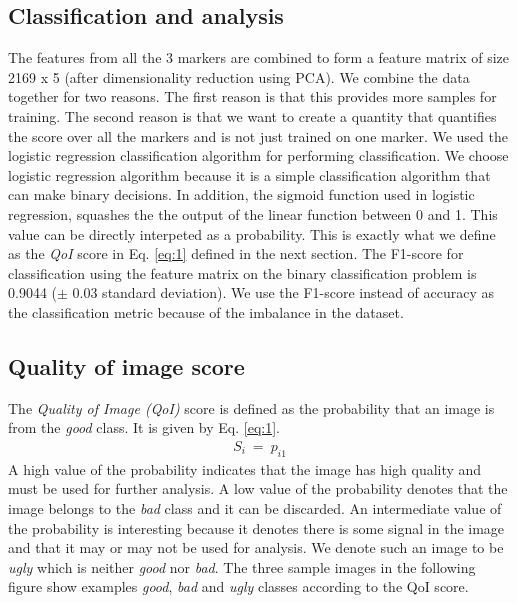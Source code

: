 \subsection{Classification and analysis}
The features from all the 3 markers are combined to form a feature matrix of size 2169 x 5 (after dimensionality reduction using PCA). We combine the data together for two reasons. The first reason is that this provides more samples for training. The second reason is that we want to create a quantity that quantifies the score over all the markers and is not just trained on one marker. 
We used the logistic regression classification algorithm for performing classification. We choose logistic regression algorithm because it is a simple classification algorithm that can make binary decisions. In addition, the sigmoid function used in logistic regression, squashes the the output of the linear function between 0 and 1. This value can be directly interpeted as a probability. This is exactly what we define as the \textit{QoI} score in Eq. \ref{eq:1} defined in the next section.
The F1-score for classification using the feature matrix on the binary classification problem is 0.9044 ($\pm$  0.03 standard deviation). We use the F1-score instead of accuracy as the classification metric because of the imbalance in the dataset.

\subsection{Quality of image score}
The \textit{Quality of Image (QoI)} score is defined as the probability that an image is from the \textit{good} class. It is given by Eq. \ref{eq:1}.
\begin{equation}
\begin{gathered} 
S_i \ =  \ p_{i1} 
\end{gathered}
\label{eq:1}
\end{equation}
A high value of the probability indicates that the image has high quality and must be used for further analysis. A low value of the probability denotes that the image belongs to the \textit{bad} class and it can be discarded. An intermediate value of the probability is interesting because it denotes there is some signal in the image and that it may or may not be used for analysis. We denote such an image to be \textit{ugly} which is neither \textit{good} nor \textit{bad}.
 The three sample images in the following figure show examples \textit{good}, \textit{bad} and \textit{ugly} classes according to the QoI score. 

